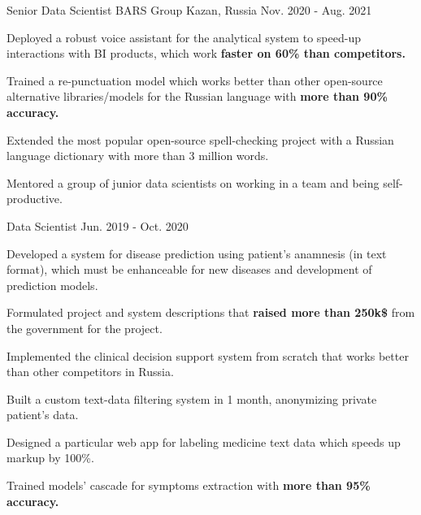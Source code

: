 \begin{cventries}
  \cventry
    {Senior Data Scientist} %
    {BARS Group} %
    {Kazan, Russia} %
    {Nov. 2020 - Aug. 2021} %
    {
      \begin{cvitems} %
        \item {Deployed a robust voice assistant for the analytical system to speed-up interactions with BI products, which work \textbf{faster on 60\% than competitors.}}
        \item {Trained a re-punctuation model which works better than other open-source alternative libraries/models for the Russian language with \textbf{more than 90\% accuracy.}}
        \item {Extended the most popular open-source spell-checking project with a Russian language dictionary with more than 3 million words.}
        \item {Mentored a group of junior data scientists on working in a team and being self-productive.}
      \end{cvitems}
    }

  \cventry
    {Data Scientist} %
    {} %
    {} %
    {Jun. 2019 - Oct. 2020} %
    {
      \begin{cvitems} %
        \item {Developed a system for disease prediction using patient's anamnesis (in text format), which must be enhanceable for new diseases and development of prediction models.}
        \item {Formulated project and system descriptions that \textbf{raised more than 250k\$} from the government for the project.}
        \item {Implemented the clinical decision support system from scratch that works better than other competitors in Russia.}
        \item {Built a custom text-data filtering system in 1 month, anonymizing private patient's data.}
        \item {Designed a particular web app for labeling medicine text data which speeds up markup by 100\%.}
        \item {Trained models' cascade for symptoms extraction with \textbf{more than 95\% accuracy.}}
      \end{cvitems}
    }


\end{cventries}
